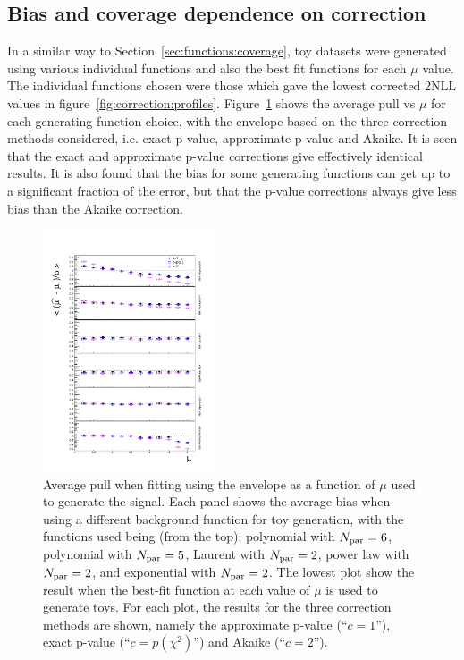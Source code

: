 


\subsection{Bias and coverage dependence on correction}
\label{sec:correction:bias}

In a similar way to Section~\ref{sec:functions:coverage}, toy datasets
were generated using various individual functions and also the best fit
functions for each $\mu$ value. The individual functions chosen were those
which gave the lowest corrected 2NLL values in 
figure~\ref{fig:correction:profiles}.
Figure~\ref{fig:correction:allorderbias} shows the average pull vs $\mu$
for each generating function choice, with the envelope based on the
three correction methods considered, i.e. exact p-value, approximate p-value
and Akaike. It is seen that the exact and approximate p-value corrections give
effectively identical results. It is also found that the bias for some
generating functions can get up to a significant fraction of the error, but
that the p-value corrections always give less bias than the Akaike correction.
%
\begin{figure}[tbp]
\centering
\includegraphics[width=0.45\textwidth]{correction/AllOrderFunctions_call.pdf}
\caption{Average pull when fitting using the envelope as a function of $\mu$ 
used to generate the signal. Each panel shows the average bias when using 
a different background function for toy generation, with the functions
used being (from the top): polynomial with $N_{\rm par}=6$,
polynomial with $N_{\rm par}=5$, Laurent with $N_{\rm par}=2$,
power law with $N_{\rm par}=2$, and exponential with $N_{\rm par}=2$.
The lowest plot show the result when the best-fit function at each
value of $\mu$ is used to generate toys.
For each plot, the results for the three correction methods are shown,
namely the approximate p-value (``$c=1$''), exact p-value (``$c=p(\chi^2)$'')
and Akaike (``$c=2$'').}
\label{fig:correction:allorderbias}
\end{figure}

